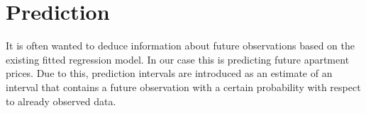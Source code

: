     

































\section{Prediction}\label{sec:prediction}
It is often wanted to deduce information about future observations based on the existing fitted regression model. 
In our case this is predicting future apartment prices. 
Due to this, prediction intervals are introduced as an estimate of an interval that contains a future observation with a certain probability with respect to already observed data.

